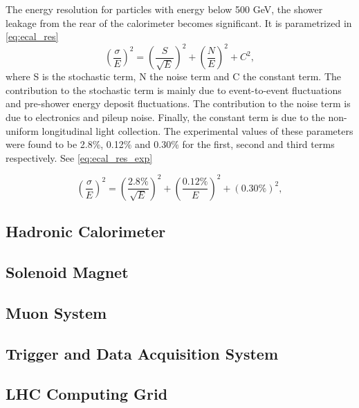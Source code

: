 The energy resolution for particles with energy below 500 GeV, the shower leakage from the rear of the calorimeter becomes significant. It is parametrized in \ref{eq:ecal_res}
\begin{equation}
\left(\frac{\sigma}{E}\right)^{2} = \left(\frac{S}{\sqrt{E}}\right)^{2} + \left(\frac{N}{E}\right)^{2} + C^{2},
  \label{eq:ecal_res}
\end{equation}
where S is the stochastic term, N the noise term and C the constant term. The contribution to the stochastic term is mainly due to event-to-event fluctuations and pre-shower energy deposit fluctuations. The contribution to the noise term is due to electronics and pileup noise. Finally, the constant term is due to the non-uniform longitudinal light collection. The experimental values of these parameters were found to be 2.8\%, 0.12\% and 0.30\% for the first, second and third terms respectively. See \ref{eq:ecal_res_exp}

\begin{equation}
\left(\frac{\sigma}{E}\right)^{2} = \left(\frac{2.8\%}{\sqrt{E}}\right)^{2} + \left(\frac{0.12\%}{E}\right)^{2} + \left(0.30\%\right)^{2},
  \label{eq:ecal_res_exp}
\end{equation}
\subsection{Hadronic Calorimeter}


\subsection{Solenoid Magnet}

\subsection{Muon System}

\subsection{Trigger and Data Acquisition System}

\subsection{LHC Computing Grid}
